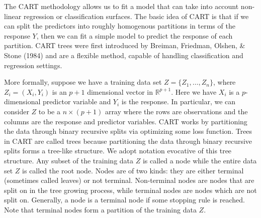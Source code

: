 \documentclass[12pt,twoside]{reedthesis}
\theoremstyle{definition}
\theoremstyle{definition}
\theoremstyle{definition}
\theoremstyle{remark}
\begin{document}
The CART methodology allows us to fit a model that can take into account
non-linear regression or classification surfaces. The basic idea of CART
is that if we can split the predictors into roughly homogenous
partitions in terms of the response \(Y\), then we can fit a simple
model to predict the response of each partition. CART trees were first
introduced by Breiman, Friedman, Olshen, \& Stone (1984) and are a
flexible method, capable of handling classification and regression
settings. \par

More formally, suppose we have a training data set
\(Z=\{Z_1,\ldots,Z_n\}\), where \(Z_i=(X_i,Y_i)\) is an \(p+1\)
dimensional vector in \(\mathbb{R}^{p+1}\). Here we have \(X_i\) is a
\(p\)-dimensional predictor variable and \(Y_i\) is the response. In
particular, we can consider \(Z\) to be a \(n\times (p+1)\) array where
the rows are observations and the columns are the response and predictor
variables. CART works by partitioning the data through binary recursive
splits via optimizing some loss function. Trees in CART are called trees
because partitioning the data through binary recursive splits forms a
tree-like structure. We adopt notation evocative of this tree structure.
Any subset of the training data \(Z\) is called a node while the entire
data set \(Z\) is called the root node. Nodes are of two kinds: they are
either terminal (sometimes called leaves) or not terminal. Non-terminal
nodes are nodes that are split on in the tree growing process, while
terminal nodes are nodes which are not split on. Generally, a node is a
terminal node if some stopping rule is reached. Note that terminal nodes
form a partition of the training data \(Z\). \par
\end{document}
